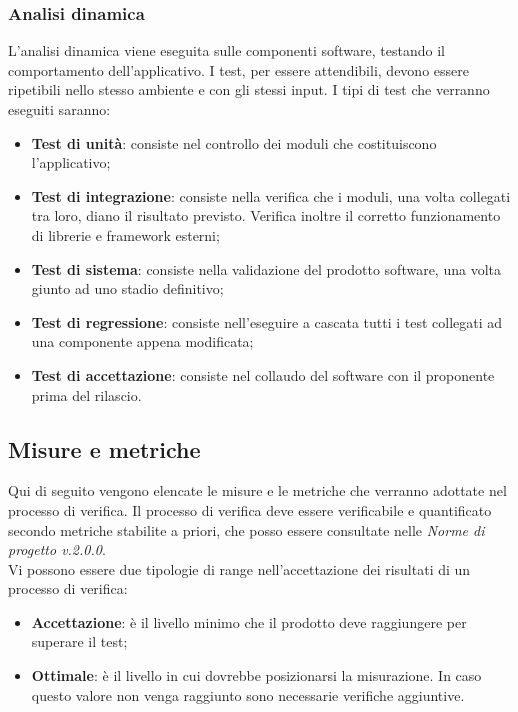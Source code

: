 \documentclass[12pt,a4paper,titlepage]{article}
\begin{document}
		\subsubsection{Analisi dinamica}
		L'analisi dinamica viene eseguita sulle componenti software, testando il comportamento dell'applicativo. I test, per essere attendibili, devono essere ripetibili nello stesso ambiente e con gli stessi input.
		I tipi di test che verranno eseguiti saranno:
		\begin{itemize}
			\item \textbf{Test di unità}: consiste nel controllo dei moduli che costituiscono l'applicativo;
			\item \textbf{Test di integrazione}: consiste nella verifica che i moduli, una volta collegati tra loro, diano il risultato previsto. Verifica inoltre il corretto funzionamento di librerie e framework esterni;
			\item \textbf{Test di sistema}: consiste nella validazione del prodotto software, una volta giunto ad uno stadio definitivo;
			\item \textbf{Test di regressione}: consiste nell'eseguire a cascata tutti i test collegati ad una componente appena modificata;
			\item \textbf{Test di accettazione}: consiste nel collaudo del software con il proponente prima del rilascio.
		\end{itemize}
	
	\subsection{Misure e metriche}
	\label{MisureMetriche}
	Qui di seguito vengono elencate le misure e le metriche che verranno adottate nel processo di verifica. Il processo di verifica deve essere verificabile e quantificato secondo metriche stabilite a priori, che posso essere consultate nelle \textit{Norme di progetto v.2.0.0}.\\
	Vi possono essere due tipologie di range nell'accettazione dei risultati di un processo di verifica:
	\begin{itemize}
		\item \textbf{Accettazione}: è il livello minimo che il prodotto deve raggiungere per superare il test;
		\item \textbf{Ottimale}: è il livello in cui dovrebbe posizionarsi la misurazione. In caso questo valore non venga raggiunto sono necessarie verifiche aggiuntive.
	\end{itemize}
\end{document}
